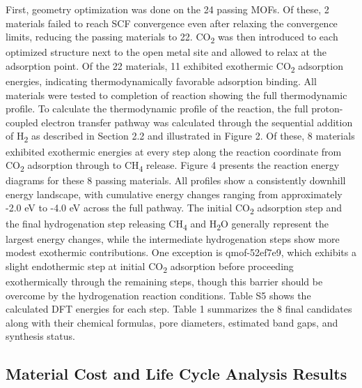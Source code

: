 \documentclass[twoside,twocolumn,9pt]{article}
\begin{document}
First, geometry optimization was done on the 24 passing MOFs. Of these, 2 materials failed to reach SCF convergence even after relaxing the convergence limits, reducing the passing materials to 22. CO\textsubscript{2} was then introduced to each optimized structure next to the open metal site and allowed to relax at the adsorption point. Of the 22 materials, 11 exhibited exothermic CO\textsubscript{2} adsorption energies, indicating thermodynamically favorable adsorption binding. All materials were tested to completion of reaction showing the full thermodynamic profile. 
To calculate the thermodynamic profile of the reaction, the full proton-coupled electron transfer pathway was calculated through the sequential addition of H\textsubscript{2} as described in Section 2.2 and illustrated in Figure 2. Of these, 8 materials exhibited exothermic energies at every step along the reaction coordinate from CO\textsubscript{2} adsorption through to CH\textsubscript{4} release. Figure 4 presents the reaction energy diagrams for these 8 passing materials. All profiles show a consistently downhill energy landscape, with cumulative energy changes ranging from approximately -2.0 eV to -4.0 eV across the full pathway. The initial CO\textsubscript{2} adsorption step and the final hydrogenation step releasing CH\textsubscript{4} and H\textsubscript{2}O generally represent the largest energy changes, while the intermediate hydrogenation steps show more modest exothermic contributions. One exception is qmof-52ef7e9, which exhibits a slight endothermic step at initial CO\textsubscript{2} adsorption before proceeding exothermically through the remaining steps, though this barrier should be overcome by the hydrogenation reaction conditions. Table S5 shows the calculated DFT energies for each step. Table 1 summarizes the 8 final candidates along with their chemical formulas, pore diameters, estimated band gaps, and synthesis status.




\subsection{Material Cost and Life Cycle Analysis Results}
\end{document}

